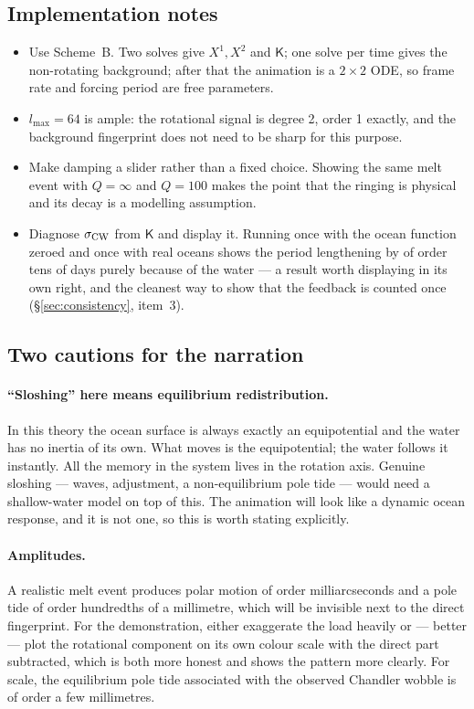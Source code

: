 \documentclass[11pt,a4paper]{article}
\newcommand{\K}{\mathsf{K}}
\begin{document}
\subsection{Implementation notes}
\label{sec:demo_impl}

\begin{itemize}
  \item Use Scheme~B. Two solves give $X^1,X^2$ and $\K$; one solve per time gives the non-rotating
  background; after that the animation is a $2\times2$ ODE, so frame rate and forcing period are
  free parameters.
  \item $l_{\max}=64$ is ample: the rotational signal is degree 2, order 1 exactly, and the
  background fingerprint does not need to be sharp for this purpose.
  \item Make damping a slider rather than a fixed choice. Showing the same melt event with
  $Q=\infty$ and $Q=100$ makes the point that the ringing is physical and its decay is a modelling
  assumption.
  \item Diagnose $\sigma_{\rm CW}$ from $\K$ and display it. Running once with the ocean function
  zeroed and once with real oceans shows the period lengthening by of order tens of days purely
  because of the water --- a result worth displaying in its own right, and the cleanest way to show that the
  feedback is counted once (\S\ref{sec:consistency}, item~3).
\end{itemize}

\subsection{Two cautions for the narration}

\paragraph{``Sloshing'' here means equilibrium redistribution.} In this theory the ocean surface is
always exactly an equipotential and the water has no inertia of its own. What moves is the
equipotential; the water follows it instantly. All the memory in the system lives in the rotation
axis. Genuine sloshing --- waves, adjustment, a non-equilibrium pole tide --- would need a
shallow-water model on top of this. The animation will look like a dynamic ocean response, and it is
not one, so this is worth stating explicitly.

\paragraph{Amplitudes.} A realistic melt event produces polar motion of order milliarcseconds and a
pole tide of order hundredths of a millimetre, which will be invisible next to the direct
fingerprint. For the demonstration, either exaggerate the load heavily or --- better --- plot the
rotational component on its own colour scale with the direct part subtracted, which is both more
honest and shows the pattern more clearly. For scale, the equilibrium pole tide associated with the
observed Chandler wobble is of order a few millimetres.
\end{document}

